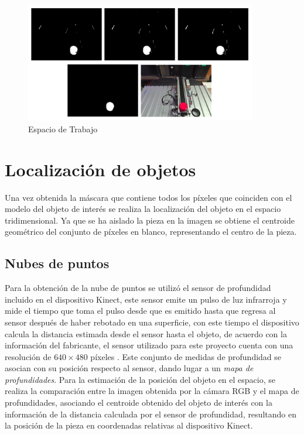 \begin{figure}[ht]
\centering
\includegraphics[width=0.9\textwidth]{Figures/Masks_WS_3.png}
    \caption{Espacio de Trabajo}
    \label{fig:Masks_WorkSpace}
\end{figure}

\section{Localización de objetos}

Una vez obtenida la máscara que contiene todos los píxeles que coinciden con el modelo del objeto de interés se realiza la localización del objeto en el espacio tridimensional. Ya que se ha aislado la pieza en la imagen se obtiene el centroide geométrico del conjunto de píxeles en blanco, representando el centro de la pieza. 


\subsection{Nubes de puntos}

Para la obtención de la nube de puntos se utilizó el sensor de profundidad incluido en el dispositivo Kinect, este sensor emite un pulso de luz infrarroja y mide el tiempo que toma el pulso desde que es emitido hasta que regresa al sensor después de haber rebotado en una superficie, con este tiempo el dispositivo calcula la distancia estimada desde el sensor hasta el objeto, de acuerdo con la información del fabricante, el sensor utilizado para este proyecto cuenta con una resolución de $640 \times 480$ píxeles \cite{davison_kinect_2012}. Este conjunto de medidas de profundidad se asocian con su posición respecto al sensor, dando lugar a un \textit{mapa de profundidades}. Para la estimación de la posición del objeto en el espacio, se realiza la comparación entre la imagen obtenida por la cámara RGB y el mapa de profundidades, asociando el centroide obtenido del objeto de interés con la información de la distancia calculada por el sensor de profundidad, resultando en la posición de la pieza en coordenadas relativas al dispositivo Kinect.
